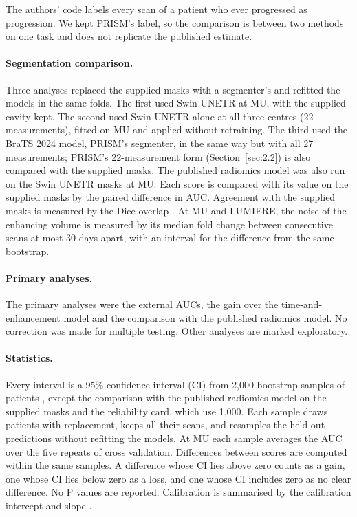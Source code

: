 \documentclass[largeformat]{interact} %
\begin{document}
The authors' code labels every scan of a patient who ever progressed as progression. We kept PRISM's label, so the
comparison is between two methods on one task and does not replicate the published estimate.

\paragraph*{Segmentation comparison.} Three analyses replaced the supplied masks with a segmenter's and
refitted the models in the same folds. The first used Swin UNETR at MU, with the supplied cavity kept. The second used
Swin UNETR alone at all three centres (22 measurements), fitted on MU and applied without retraining. The third used the BraTS 2024 model, PRISM's segmenter, in the same way but with all 27 measurements; PRISM's
22-measurement form (Section~\ref{sec:2.2}) is also compared with the supplied masks.
The published radiomics model was also run on the Swin UNETR masks at MU. Each score is compared with its value on the
supplied masks by the paired difference in AUC. 
Agreement with the supplied masks
is measured by the Dice overlap \citep{dice1945}. At MU and LUMIERE, the noise of the enhancing volume is measured by
its median fold change between consecutive scans at most 30 days apart, with an interval for the difference from the
same bootstrap.

\paragraph*{Primary analyses.} The primary analyses were the external AUCs, the gain over the time-and-enhancement
model and the comparison with the published radiomics model. No correction was made for multiple testing. Other
analyses are marked exploratory.



\paragraph*{Statistics.} Every interval is a 95\% confidence interval (CI) from 2,000 bootstrap samples of patients
\citep{field2007}, except the comparison with the published radiomics model on the supplied masks and the reliability
card, which use 1,000. Each sample draws patients with replacement, keeps all their scans, and resamples the
held-out predictions without refitting the models. At MU each sample averages the AUC over the five repeats of cross
validation. Differences between scores are computed within the same samples. A difference whose CI lies above zero counts as a gain, one whose CI lies below zero as a loss, and one whose CI
includes zero as no clear difference. No P values are reported. Calibration is
summarised by the calibration intercept and slope \citep{vancalster2019}.
\end{document}
